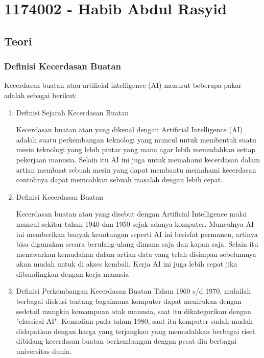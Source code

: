 \section{1174002 - Habib Abdul Rasyid}

\subsection{Teori}
\subsubsection{Definisi Kecerdasan Buatan}
\hfill\break
Kecerdasan buatan atau artificial intelligence (AI) menurut beberapa pakar adalah sebagai berikut:
\begin{enumerate}

\item Definisi Sejarah Kecerdasan Buatan

Kecerdasan buatan atau yang dikenal dengan Artificial Intelligence (AI) adalah suatu perkembangan teknologi yang muncul untuk membentuk suatu mesin teknologi yang lebih pintar yang mana agar lebih memudahkan setiap pekerjaan manusia. Selain itu AI ini juga untuk memahami kecerdasan dalam artian membuat sebuah mesin yang dapat membantu memahami kecerdasan contohnya dapat memcahkan sebuah masalah dengan lebih cepat.

\item Definisi Kecerdasan Buatan

Kecerdasan buatan atau yang disebut dengan Artificial Intelligence mulai muncul sekitar tahun 1940 dan 1950 sejak adanya komputer. Munculnya AI ini memberikan banyak keuntungan seperti AI ini berisfat permanen, artinya bisa digunakan secara berulang-ulang dimana saja dan kapan saja. Selain itu menawarkan kemudahan dalam artian data yang telah disimpan sebelumnya akan mudah untuk di akses kembali. Kerja AI ini juga lebih cepat jika dibandingkan dengan kerja manusia


\item Definisi Perkembangan Kecerdasan Buatan
Tahun 1960 s/d 1970, mulailah berbagai diskusi tentang bagaimana komputer dapat menirukan dengan sedetail mungkin kemampuan otak manusia, saat itu dikategorikan dengan "classical AI". Kemudian pada tahun 1980, saat itu komputer sudah mudah didapatkan dengan harga yang terjangkau yang memudahkan berbagai riset dibidang kecerdasan buatan berkembangan dengan pesat diu berbagai universitas dunia.\\


\end{enumerate}
